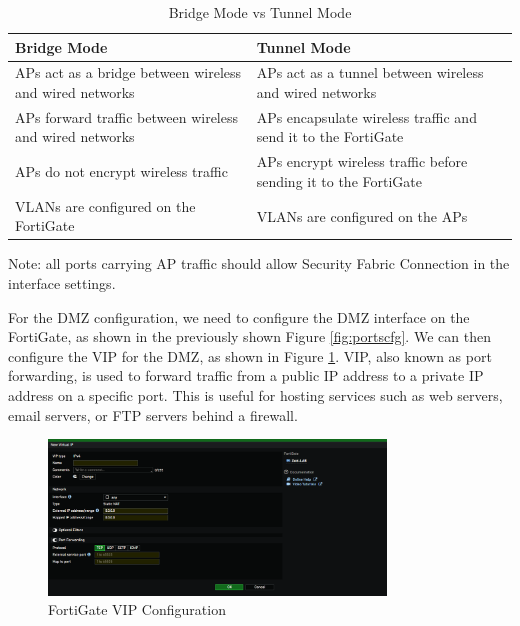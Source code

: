 \documentclass[12pt]{report}
\begin{document}
\begin{table}[h]
    \centering
    \begin{tabular}{|>{\centering\arraybackslash}m{5cm}|>{\centering\arraybackslash}m{5cm}|}
        \hline
        \textbf{Bridge Mode} & \textbf{Tunnel Mode} \\
        \hline
        APs act as a bridge between wireless and wired networks & APs act as a tunnel between wireless and wired networks \\
        \hline
        APs forward traffic between wireless and wired networks & APs encapsulate wireless traffic and send it to the FortiGate \\
        \hline
        APs do not encrypt wireless traffic & APs encrypt wireless traffic before sending it to the FortiGate \\
        \hline
        VLANs are configured on the FortiGate & VLANs are configured on the APs \\
        \hline
    \end{tabular}
    \caption{Bridge Mode vs Tunnel Mode}
    \label{tab:bridgevstunnel}
\end{table}
Note: all ports carrying AP traffic should allow Security Fabric Connection in the interface settings.

For the DMZ configuration, we need to configure the DMZ interface on the FortiGate, as shown in the previously shown Figure \ref{fig:portscfg}. We can then configure the VIP for the DMZ, as shown in Figure \ref{fig:vip}. VIP, also known as port forwarding, is used to forward traffic from a public IP address to a private IP address on a specific port. This is useful for hosting services such as web servers, email servers, or FTP servers behind a firewall.
\begin{figure}
    \centering
    \includegraphics[width=0.8\textwidth]{images/Implementation/vip.png}
    \caption{FortiGate VIP Configuration}
    \label{fig:vip}
\end{figure}
\end{document}
